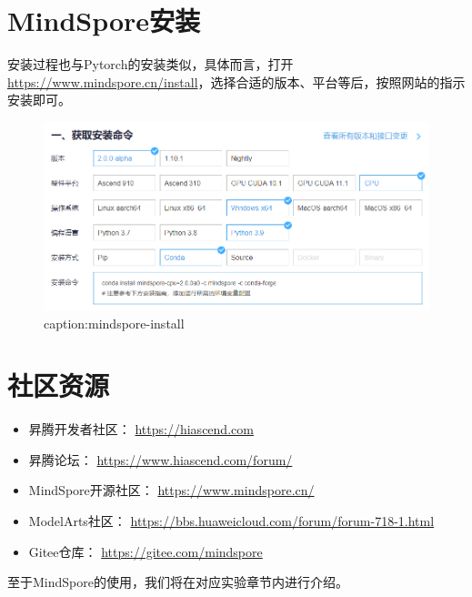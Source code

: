\section{MindSpore安装}

安装过程也与Pytorch的安装类似，具体而言，打开\url{https://www.mindspore.cn/install}，选择合适的版本、平台等后，按照网站的指示安装即可。

\begin{figure}[htbp]
	\centering
	\includegraphics[width=1\textwidth]{figures/mindspore-install.png}
	\caption{caption:mindspore-install}
	\label{fig:mindspore-install}
\end{figure}

\section{社区资源}
\begin{itemize}
    \item {昇}腾开发者社区： \url{https://hiascend.com}
    \item {昇}腾论坛： \url{https://www.hiascend.com/forum/}
    \item MindSpore开源社区：  \url{https://www.mindspore.cn/}
    \item ModelArts社区：  \url{https://bbs.huaweicloud.com/forum/forum-718-1.html}
    \item Gitee仓库： \url{https://gitee.com/mindspore}
\end{itemize}



\vspace{3em}
至于MindSpore的使用，我们将在对应实验章节内进行介绍。